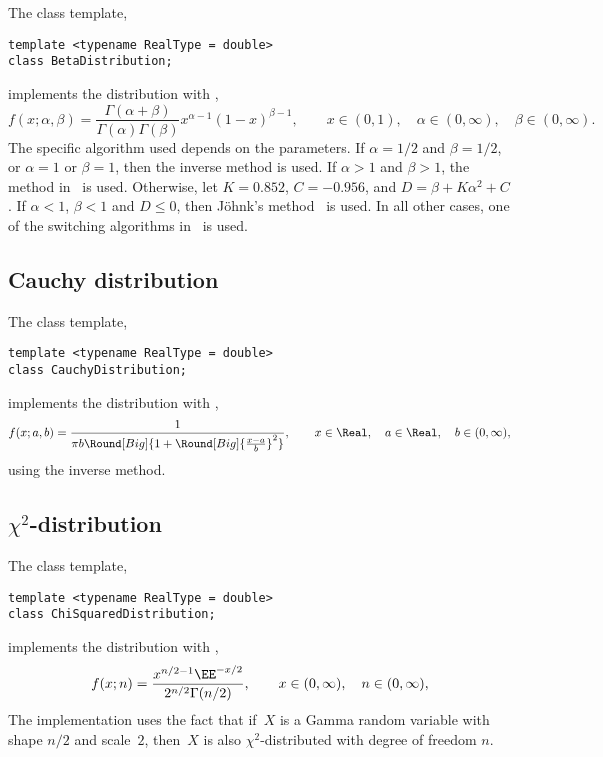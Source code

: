 The class template,
\begin{verbatim}
template <typename RealType = double>
class BetaDistribution;
\end{verbatim}
implements the distribution with \pdf,
\begin{equation*}
  f(x;\alpha,\beta) =
  \frac{\Gamma(\alpha + \beta)}{\Gamma(\alpha)\Gamma(\beta)}
  x^{\alpha - 1}(1 - x)^{\beta - 1},\qquad
  x \in (0, 1),\quad \alpha \in (0,\infty),\quad \beta \in (0,\infty).
\end{equation*}
The specific algorithm used depends on the parameters. If $\alpha = 1/2$ and
$\beta = 1/2$, or $\alpha = 1$ or $\beta = 1$, then the inverse method is used.
If $\alpha > 1$ and $\beta > 1$, the method in~\cite{Cheng:1978jl} is used.
Otherwise, let $K = 0.852$, $C = -0.956$, and $D = \beta + K\alpha^2 + C$. If
$\alpha < 1$, $\beta < 1$ and $D \le 0$, then Jöhnk's
method~\cite[sec.~3.5]{Devroye:1986gi} is used. In all other cases, one of the
switching algorithms in~\cite{Atkinson:1979es} is used.

\subsection{Cauchy distribution}
\label{sub:Cauchy distribution}

The class template,
\begin{verbatim}
template <typename RealType = double>
class CauchyDistribution;
\end{verbatim}
implements the distribution with \pdf,
\begin{equation*}
  f(x;a,b) =
  \frac{1}{\pi b\Round[Big]{1 + \Round[Big]{\frac{x - a}{b}}^2}},\qquad
  x \in \Real,\quad a \in \Real,\quad b \in (0,\infty),
\end{equation*}
using the inverse method.

\subsection{\texorpdfstring{$\chi^2$}{Chi-squared}-distribution}
\label{Chi-squared-distribution}

The class template,
\begin{verbatim}
template <typename RealType = double>
class ChiSquaredDistribution;
\end{verbatim}
implements the distribution with \pdf,
\begin{equation*}
  f(x;n) = \frac{x^{n/2 - 1}\EE^{-x/2}}{2^{n/2}\Gamma(n/2)},\qquad
  x \in (0,\infty),\quad n \in (0,\infty),
\end{equation*}
The implementation uses the fact that if~$X$ is a Gamma random variable with
shape $n / 2$ and scale~$2$, then~$X$ is also $\chi^2$-distributed with degree
of freedom $n$.

